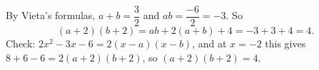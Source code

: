 By Vieta's formulas, $a+b=\dfrac32$ and $ab=\dfrac{-6}{2}=-3$. So
\[(a+2)(b+2)=ab+2(a+b)+4=-3+3+4=\boxed{4}.\]
Check: $2x^2-3x-6=2(x-a)(x-b)$, and at $x=-2$ this gives $8+6-6=2(a+2)(b+2)$, so $(a+2)(b+2)=4$.
